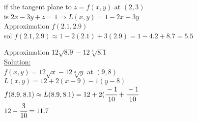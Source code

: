 \begin{example}
if the tangent plane to $z=f(x,y)$ at $(2,3)$\\
is $2x-3y+z=1\Rightarrow L(x,y)=1-2x+3y$\\
Approximation $f(2.1,2.9)$\\
sol $f(2.1,2.9)\approx 1-2(2.1)+3(2.9)=1-4.2+8.7=5.5$
\end{example}
\noindent{\color{smalt(darkpowderblue)}\rule{\linewidth}{.2mm}}

\begin{example}
Approximation $12\sqrt{8.9}-12\sqrt[3]{8.1}$\\
{\color{smalt(darkpowderblue)}\underline{Solution:}}\\
$f(x,y)=12\sqrt{x}-12\sqrt[3]{y}$ at $(9,8)$\\
$L(x,y)=12+2(x-9)-1(y-8)$\\
$f(8.9,8.1)\approx L(8.9,8.1)=12+2(\cfrac{-1}{10}+\cfrac{-1}{10}$\\
$12-\cfrac{3}{10}=11.7$
\end{example}